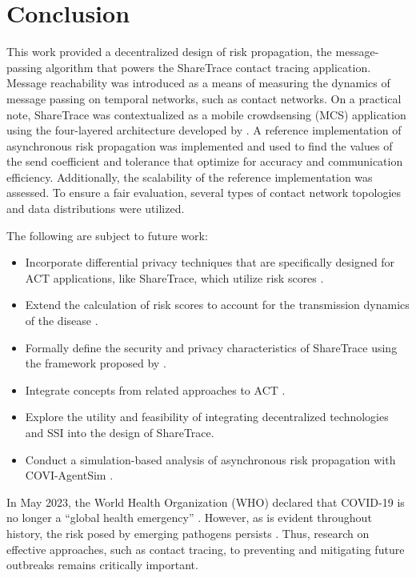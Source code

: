 \chapter{Conclusion}

This work provided a decentralized design of risk propagation, the message-passing algorithm that powers the ShareTrace contact tracing application. Message reachability was introduced as a means of measuring the dynamics of message passing on temporal networks, such as contact networks. On a practical note, ShareTrace was contextualized as a mobile crowdsensing (MCS) application using the four-layered architecture developed by \citet{Capponi2019}. A reference implementation of asynchronous risk propagation was implemented and used to find the values of the send coefficient and tolerance that optimize for accuracy and communication efficiency. Additionally, the scalability of the reference implementation was assessed. To ensure a fair evaluation, several types of contact network topologies and data distributions were utilized.

The following are subject to future work:
\begin{itemize}
  \item Incorporate differential privacy techniques that are specifically designed for ACT applications, like ShareTrace, which utilize risk scores \citep{Romijnders2024}.
  \item Extend the calculation of risk scores to account for the transmission dynamics of the disease \citep{Ferretti2020, Ferretti2024}.
  \item Formally define the security and privacy characteristics of ShareTrace using the framework proposed by \citet{Kuhn2021}.
  \item Integrate concepts from related approaches to ACT \citep{Reichert2020, Cho2020, Cherini2023, Gupta2023}.
  \item Explore the utility and feasibility of integrating decentralized technologies \citep{Benet2014, Troncoso2017, Trautwein2022, Shi2024, Keizer2024} and SSI \citep{Preukschat2021, Schardong2022} into the design of ShareTrace.
  \item Conduct a simulation-based analysis of asynchronous risk propagation with COVI-AgentSim \citep{Gupta2020}.
\end{itemize}

In May 2023, the World Health Organization (WHO) declared that COVID-19 is no longer a ``global health emergency'' \citep{Wise2023}. However, as is evident throughout history, the risk posed by emerging pathogens persists \citep{Piret2021, Tabish2022}. Thus, research on effective approaches, such as contact tracing, to preventing and mitigating future outbreaks remains critically important.